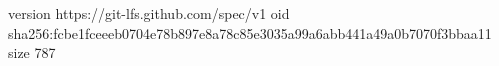 version https://git-lfs.github.com/spec/v1
oid sha256:fcbe1fceeeb0704e78b897e8a78c85e3035a99a6abb441a49a0b7070f3bbaa11
size 787
